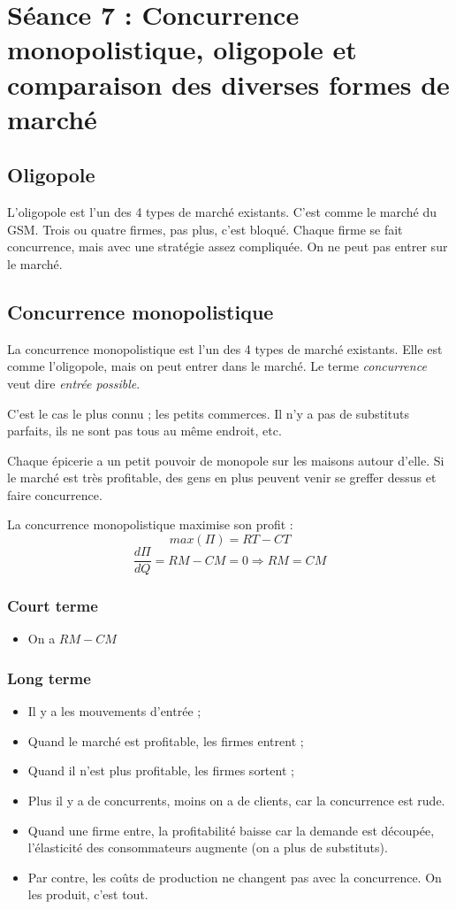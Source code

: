 \section{Séance 7 : Concurrence monopolistique, oligopole et comparaison des diverses formes de marché}






\subsection{Oligopole}
L'oligopole est l'un des 4 types de marché existants. C'est comme le marché du GSM. Trois ou quatre firmes, pas plus, c'est bloqué. Chaque firme se fait concurrence, mais avec une stratégie assez compliquée. On ne peut pas entrer sur le marché.


\subsection{Concurrence monopolistique}
La concurrence monopolistique est l'un des 4 types de marché existants. Elle est comme l'oligopole, mais on peut entrer dans le marché. Le terme \textit{concurrence} veut dire \textit{entrée possible}.

C'est le cas le plus connu ; les petits commerces. Il n'y a pas de substituts parfaits, ils ne sont pas tous au même endroit, etc.

Chaque épicerie a un petit pouvoir de monopole sur les maisons autour d'elle. Si le marché est très profitable, des gens en plus peuvent venir se greffer dessus et faire concurrence.

La concurrence monopolistique maximise son profit :
$$max( \Pi ) = RT - CT$$
$$\frac{d\Pi}{dQ} = RM - CM = 0 \Rightarrow RM = CM$$

\subsubsection{Court terme}
\begin{itemize}
	\item On a $RM - CM$
\end{itemize}

\subsubsection{Long terme}
\begin{itemize}
	\item Il y a les mouvements d'entrée ;
	\item Quand le marché est profitable, les firmes entrent ;
	\item Quand il n'est plus profitable, les firmes sortent ;
	\item Plus il y a de concurrents, moins on a de clients, car la concurrence est rude.
	\item Quand une firme entre, la profitabilité baisse car la demande est découpée, l'élasticité des consommateurs augmente (on a plus de substituts).
	\item Par contre, les coûts de production ne changent pas avec la concurrence. On les produit, c'est tout.
\end{itemize}

